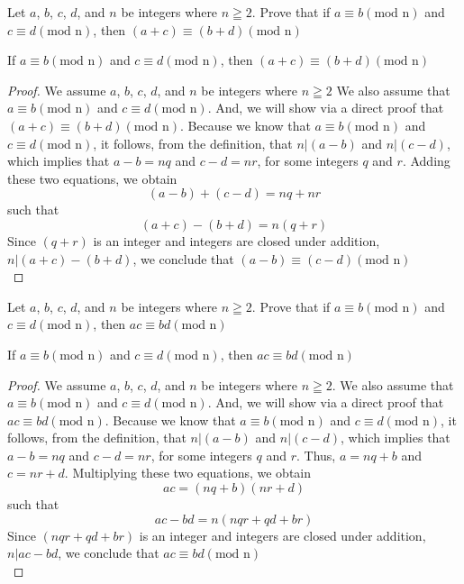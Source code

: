 \begin{example}
Let $a$, $b$, $c$, $d$, and $n$ be integers where $n \geqq 2$. Prove that if $a \equiv b (\text{mod n})$ and $c \equiv d (\text{mod n})$, then $ (a + c) \equiv (b + d) (\text{mod n})$

\begin{tcolorbox}
	\begin{theorem}
		If $a \equiv b (\text{mod n})$ and $c \equiv d (\text{mod n})$, then $(a + c) \equiv (b + d) (\text{mod n})$
	\end{theorem}
\end{tcolorbox}

\begin{proof}
We assume $a$, $b$, $c$, $d$, and $n$ be integers where $n \geqq 2$ We also assume that $a \equiv b (\text{mod n})$ and $c \equiv d (\text{mod n})$. And, we will show via a direct proof that $(a + c) \equiv (b + d) (\text{mod n})$. Because we know that $a \equiv b (\text{mod n})$ and $c \equiv d (\text{mod n})$, it follows, from the definition, that   $n | (a-b)$ and $n | (c-d)$, which implies that $a-b = nq$ and $c-d = nr$, for some integers $q$ and $r$. Adding these two equations, we obtain \[ (a-b) + (c-d) = nq + nr \]such that \[ (a+c) - (b+d) = n(q + r) \] 
Since $(q + r)$ is an integer and integers are closed under addition, $n | (a+c) - (b+d)$, we conclude that $(a-b) \equiv (c-d) (\text{mod n})$ \\
\end{proof}
\end{example}


\begin{example}
Let $a$, $b$, $c$, $d$, and $n$ be integers where $n \geqq 2$. Prove that if $a \equiv b (\text{mod n})$ and $c \equiv d (\text{mod n})$, then $ ac \equiv bd (\text{mod n})$

\begin{tcolorbox}
	\begin{theorem}
		 If $a \equiv b (\text{mod n})$ and $c \equiv d (\text{mod n})$, then $ ac \equiv bd (\text{mod n})$
	\end{theorem}
\end{tcolorbox}

\begin{proof}
We assume $a$, $b$, $c$, $d$, and $n$ be integers where $n \geqq 2$.  We also assume that $a \equiv b (\text{mod n})$ and $c \equiv d (\text{mod n})$. And, we will show via a direct proof that $ac \equiv bd (\text{mod n})$. Because we know that $a \equiv b (\text{mod n})$ and $c \equiv d (\text{mod n})$, it follows, from the definition, that   $n | (a-b)$ and $n | (c-d)$, which implies that $a-b = nq$ and $c-d = nr$, for some integers $q$ and $r$. Thus, $a = nq + b$ and $c = nr + d$. Multiplying these two equations, we obtain \[ ac = (nq + b)(nr + d) \] such that \[ ac - bd = n(nqr + qd + br) \] 
Since $(nqr + qd + br)$ is an integer and integers are closed under addition, $n | ac - bd$, we conclude that $ac \equiv bd (\text{mod n})$ \\
\end{proof}
\end{example}



